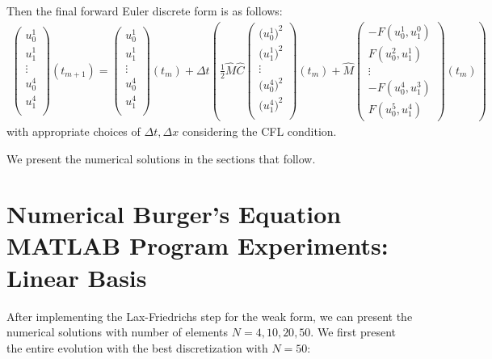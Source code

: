 \documentclass[12pt]{article} %
\newcommand{\1}[1]{\mathds{1}\left[#1\right]}
\begin{document}
Then the final forward Euler discrete form is as follows:
\begin{eqnarray}
	\begin{pmatrix}
		u_0^1 \\
		u_1^1 \\ 
		\vdots \\
		u_0^4 \\
		u_1^4 \\ 
	\end{pmatrix}(t_{m+1}) =
		\begin{pmatrix}
		u_0^1 \\
		u_1^1 \\ 
		\vdots \\
		u_0^4 \\
		u_1^4 \\ 
	\end{pmatrix}(t_{m})  + 
	\Delta t\left(\frac{1}{2} \hat{M}\hat{C}
	\begin{pmatrix}
		\big(u_0^1\big)^2 \\
		\big(u_1^1\big)^2 \\
		\vdots \\
		\big(u_0^4\big)^2 \\
		\big(u_1^4\big)^2 \\
	\end{pmatrix} (t_m)
	+
	\hat{M}
	\begin{pmatrix}
 - F(u_0^{1}, u_1^{0}) \\ F(u_0^{2}, u_1^{1}) \\ \vdots \\  - F(u_0^{4}, u_1^{3}) \\ F(u_0^{5}, u_1^{4})
	\end{pmatrix}(t_m)\right)
\end{eqnarray} with appropriate choices of $\Delta t, \Delta x$ considering the CFL condition.

We present the numerical solutions in the sections that follow.



\section{Numerical Burger's Equation MATLAB Program Experiments: Linear Basis}

\indent \indent After implementing the Lax-Friedrichs step for the weak form, we can present the numerical solutions with number of elements $N = 4, 10, 20, 50$. We first present the entire evolution with the best discretization with $N = 50$:
\newpage
\end{document}
